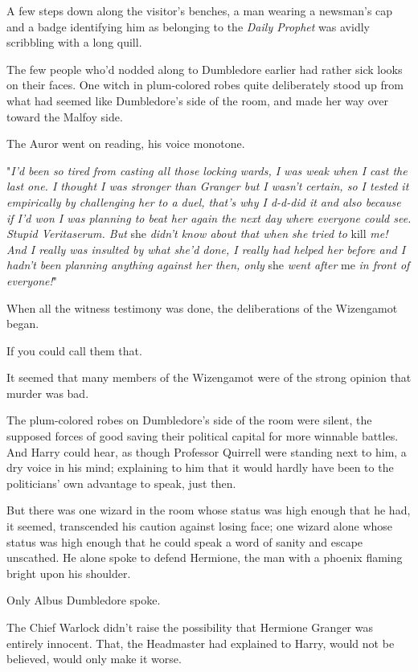 A few steps down along the visitor's benches, a man wearing a newsman's cap and
a badge identifying him as belonging to the \emph{Daily Prophet} was avidly
scribbling with a long quill.

The few people who'd nodded along to Dumbledore earlier had rather sick looks
on their faces. One witch in plum-colored robes quite deliberately stood up
from what had seemed like Dumbledore's side of the room, and made her way over
toward the Malfoy side.

The Auror went on reading, his voice monotone.

"\emph{I'd been so tired from casting all those locking wards, I was weak when I
cast the last one. I thought I was stronger than Granger but I wasn't certain,
so I tested it empirically by challenging her to a duel, that's why I d-d-did
it and also because if I'd won I was planning to beat her again the next day
where everyone could see. Stupid Veritaserum. But} she \emph{didn't know about
that when she tried to} kill \emph{me! And I really was insulted by what she'd
done, I really had helped her before and I hadn't been planning anything
against her then, only} she \emph{went after} me \emph{in front of everyone!}"

When all the witness testimony was done, the deliberations of the Wizengamot
began.

If you could call them that.

It seemed that many members of the Wizengamot were of the strong opinion that
murder was bad.

The plum-colored robes on Dumbledore's side of the room were silent, the
supposed forces of good saving their political capital for more winnable
battles. And Harry could hear, as though Professor Quirrell were standing next
to him, a dry voice in his mind; explaining to him that it would hardly have
been to the politicians' own advantage to speak, just then.

But there was one wizard in the room whose status was high enough that he had,
it seemed, transcended his caution against losing face; one wizard alone whose
status was high enough that he could speak a word of sanity and escape
unscathed. He alone spoke to defend Hermione, the man with a phoenix flaming
bright upon his shoulder.

Only Albus Dumbledore spoke.

The Chief Warlock didn't raise the possibility that Hermione Granger was
entirely innocent. That, the Headmaster had explained to Harry, would not be
believed, would only make it worse.

